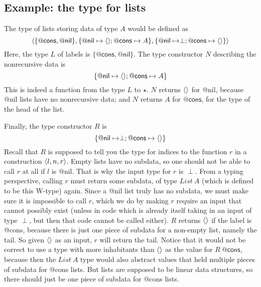 \documentclass{article}
\begin{document}
\subsection{Example: the type for lists}

\noindent The type of lists storing data of type $A$ would be defined as
\[
\langle \{\mathsf{@cons},\mathsf{@nil}\} , \{\mathsf{@nil} \mapsto \langle\rangle ; \mathsf{@cons} \mapsto A\} , \{\mathsf{@nil} \mapsto \perp ; \mathsf{@cons} \mapsto \langle\rangle\} \rangle
\]
\noindent Here, the type $L$ of labels is $\{\mathsf{@cons},\mathsf{@nil}\}$.  The type constructor $N$ describing the
nonrecursive data is
\[
\{\mathsf{@nil} \mapsto \langle\rangle ; \mathsf{@cons} \mapsto A\}
\]
\noindent This is indeed a function from the type $L$ to $\star$.  $N$
returns $\langle\rangle$ for \textsf{@nil}, because \textsf{@nil} lists have
no nonrecursive data; and $N$ returns $A$ for $\textsf{@cons}$, for the
type of the head of the list.

Finally, the type constructor $R$ is 
\[
\{\mathsf{@nil} \mapsto \perp ; \mathsf{@cons} \mapsto \langle\rangle\}
\]
\noindent Recall that $R$ is supposed to tell you the type for indices
to the function $r$ in a construction $\langle l , n, r \rangle$.  Empty lists
have no subdata, so one should not be able to call $r$ at all if $l$
is \textsf{@nil}.  That is why the input type for $r$ is $\perp$.
From a typing perspective, calling $r$ must return some subdata, of
type $\textit{List}\ A$ (which is defined to be this W-type) again.
Since a \textsf{@nil} list truly has no subdata, we must make sure it
is impossible to call $r$, which we do by making $r$ require an input
that cannot possibly exist (unless in code which is already itself
taking in an input of type $\perp$, but then that code cannot be
called either).  $R$ returns $\langle\rangle$ if the label is \textsf{@cons},
because there is just one piece of subdata for a non-empty list,
namely the tail.  So given $\langle\rangle$ as an input, $r$ will return
the tail.  Notice that it would not be correct to use a type with
more inhabitants than $\langle\rangle$ as the value for $R\ \mathsf{@cons}$,
because then the $\textit{List}\ A$ type would also abstract values that held multiple
pieces of subdata for \textsf{@cons} lists.  But lists are supposed
to be linear data structures, so there should just be one piece of
subdata for \textsf{@cons} lists.





\end{document}
